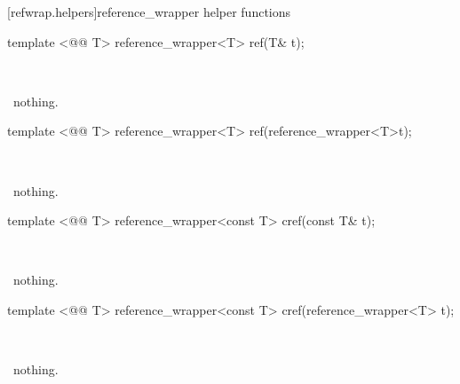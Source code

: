 \documentclass[american,twoside]{book}
\begin{document}
[refwrap.helpers]{reference_wrapper helper functions}
%
%
\begin{itemdecl}
template <@@ T> reference_wrapper<T> ref(T& t); 
\end{itemdecl}

\begin{itemdescr}
\pnum\returns\ 

\pnum\throws\ nothing. 
\end{itemdescr}

%
%
\begin{itemdecl}
template <@@ T> reference_wrapper<T> ref(reference_wrapper<T>t);
\end{itemdecl}

\begin{itemdescr}
\pnum\returns\ 

\pnum\throws\ nothing. 
\end{itemdescr}

%
%
\begin{itemdecl}
template <@@ T> reference_wrapper<const T> cref(const T& t); 
\end{itemdecl}

\begin{itemdescr}
\pnum\returns\ 

\pnum\throws\  nothing. 
\end{itemdescr}

%
%
\begin{itemdecl}
template <@@ T> reference_wrapper<const T> cref(reference_wrapper<T> t);
\end{itemdecl}

\begin{itemdescr}
\pnum\returns\ 

\pnum\throws\  nothing. 
\end{itemdescr}
\end{document}
